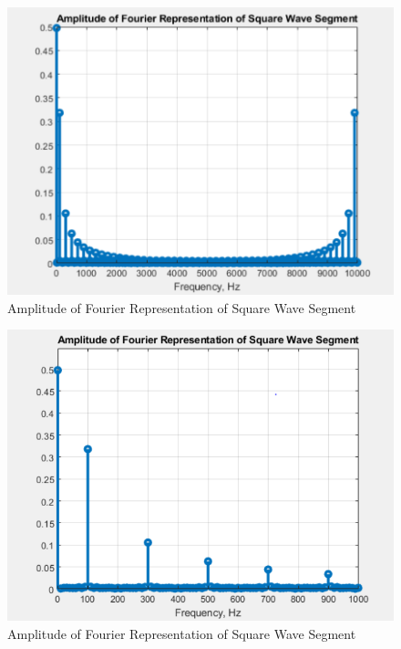 \documentclass[
	letterpaper, %
	10pt, %
]{CSUniSchoolLabReport}
\begin{document}
\begin{figure}[h!]
  \centering
  \includegraphics[width=.9\textwidth]{Figures/L13Q1-2.png}
  \caption{Amplitude of Fourier Representation of Square Wave Segment}
  \label{fig:2}
\end{figure}

\begin{figure}[h!]
  \centering
  \includegraphics[width=.9\textwidth]{Figures/L13Q1-3.png}
  \caption{Amplitude of Fourier Representation of Square Wave Segment}
  \label{fig:3}
\end{figure}
\end{document}
